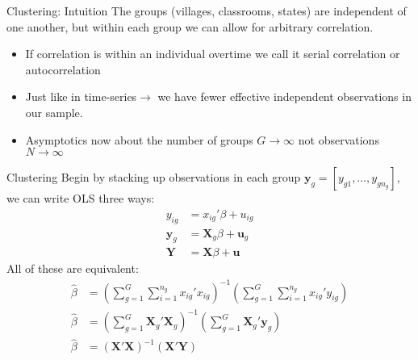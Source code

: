 \documentclass[aspectratio=169]{beamer}
\begin{document}
\begin{frame}{Clustering: Intuition}
The groups (villages, classrooms, states) are independent of one another, but within each group we can allow for arbitrary correlation.
\begin{itemize}
\item If correlation is within an individual overtime we call it \alert{serial correlation} or \alert{autocorrelation}
\item Just like in time-series$\rightarrow$ we have fewer effective independent observations in our sample.
\item Asymptotics now about the number of groups $G \rightarrow \infty$ not observations $N \rightarrow \infty$
\end{itemize}
\end{frame}

\begin{frame}{Clustering}
Begin by stacking up observations in each group $\mathbf{y}_{g }  = [y_{g1},\ldots,y_{g n_g}]$, we can write OLS three ways:
\begin{align*}
y_{ig } &= x_{ig}' \beta + u_{ig}\\
\mathbf{y}_{g } &= \mathbf{X}_{g} \beta + \mathbf{u}_{g}\\
\mathbf{Y} &= \mathbf{X} \beta + \mathbf{u}
\end{align*}
All of these are equivalent:
\begin{align*}
\widehat {  \beta  } &= \left( \sum _ { g = 1 } ^ { G } \sum _ { i = 1 } ^ { n _ { g } } x _ { i g }' { x } _ { i g } \right) ^ { - 1 } \left( \sum _ { g = 1 } ^ { G } \sum _ { i = 1 } ^ { n _ { g } } x _ { i g }' y _ { i g } \right)\\
\widehat {  \beta  }  &=  \left(  \sum _ { g = 1 } ^ { G } \mathbf{X}_g' \mathbf{X}_g \right)^{-1} \left(  \sum _ { g = 1 } ^ { G } \mathbf{X}_g' \mathbf{y}_g \right)\\
\widehat {  \beta  }  &=  \left( \mathbf{X}' \mathbf{X} \right)^{-1} \left(   \mathbf{X}' \mathbf{Y} \right)\\
\end{align*}
\end{frame}
\end{document}

